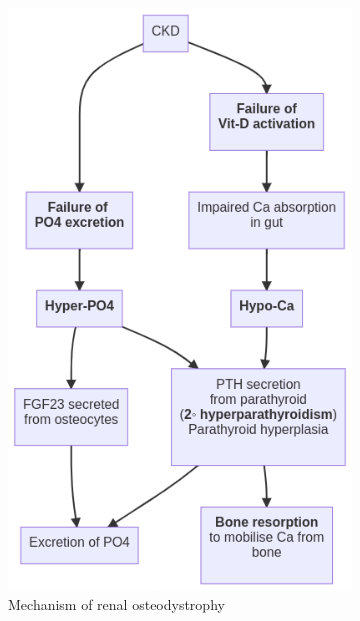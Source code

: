 \documentclass[
  12pt,
]{memoir}
\begin{document}
\pagebreak
\null
\vfill
\begin{figure}[h!]
    \centering
    \begin{subfigure}[t]{.5\textwidth}
        \includegraphics[width=\textwidth]{../assets/med/CKD-osteo.png}
        \vspace{14mm}
        \caption{Mechanism of renal osteodystrophy}
    \end{subfigure}\hfill
    \begin{subfigure}[t]{.4\textwidth}

\end{subfigure}
\end{figure}
\end{document}
